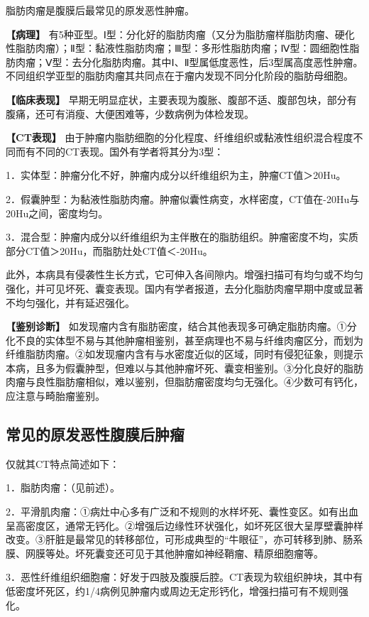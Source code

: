 脂肪肉瘤是腹膜后最常见的原发恶性肿瘤。

\textbf{【病理】}
有5种亚型。Ⅰ型：分化好的脂肪肉瘤（又分为脂肪瘤样脂肪肉瘤、硬化性脂肪肉瘤）；Ⅱ型：黏液性脂肪肉瘤；Ⅲ型：多形性脂肪肉瘤；Ⅳ型：圆细胞性脂肪肉瘤；Ⅴ型：去分化脂肪肉瘤。其中Ⅰ、Ⅱ型属低度恶性，后3型属高度恶性肿瘤。不同组织学亚型的脂肪肉瘤其共同点在于瘤内发现不同分化阶段的脂肪母细胞。

\textbf{【临床表现】}
早期无明显症状，主要表现为腹胀、腹部不适、腹部包块，部分有腹痛，还可有消瘦、大便困难等，少数病例为体检发现。

\textbf{【CT表现】}
由于肿瘤内脂肪细胞的分化程度、纤维组织或黏液性组织混合程度不同而有不同的CT表现。国外有学者将其分为3型：

1．实体型：肿瘤分化不好，肿瘤内成分以纤维组织为主，肿瘤CT值＞20Hu。

2．假囊肿型：为黏液性脂肪肉瘤。肿瘤似囊性病变，水样密度，CT值在-20Hu与20Hu之间，密度均匀。

3．混合型：肿瘤内成分以纤维组织为主伴散在的脂肪组织。肿瘤密度不均，实质部分CT值＞20Hu，而脂肪灶处CT值＜-20Hu。

此外，本病具有侵袭性生长方式，它可伸入各间隙内。增强扫描可有均匀或不均匀强化，并可见坏死、囊变表现。国内有学者报道，去分化脂肪肉瘤早期中度或显著不均匀强化，并有延迟强化。

\textbf{【鉴别诊断】}
如发现瘤内含有脂肪密度，结合其他表现多可确定脂肪肉瘤。①分化不良的实体型不易与其他肿瘤相鉴别，甚至病理也不易与纤维肉瘤区分，而划为纤维脂肪肉瘤。②如发现瘤内含有与水密度近似的区域，同时有侵犯征象，则提示本病，且多为假囊肿型，但难以与其他肿瘤坏死、囊变相鉴别。③分化良好的脂肪肉瘤与良性脂肪瘤相似，难以鉴别，但脂肪瘤密度均匀无强化。④少数可有钙化，应注意与畸胎瘤鉴别。

\subsection{常见的原发恶性腹膜后肿瘤}

仅就其CT特点简述如下：

1．脂肪肉瘤：（见前述）。

2．平滑肌肉瘤：①病灶中心多有广泛和不规则的水样坏死、囊性变区。如有出血呈高密度区，通常无钙化。②增强后边缘性环状强化，如坏死区很大呈厚壁囊肿样改变。③肝脏是最常见的转移部位，可形成典型的“牛眼征”，亦可转移到肺、肠系膜、网膜等处。坏死囊变还可见于其他肿瘤如神经鞘瘤、精原细胞瘤等。

3．恶性纤维组织细胞瘤：好发于四肢及腹膜后腔。CT表现为软组织肿块，其中有低密度坏死区，约1/4病例见肿瘤内或周边无定形钙化，增强扫描可有不规则强化。

